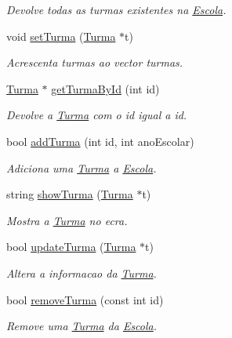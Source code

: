 \begin{DoxyCompactItemize}
\begin{DoxyCompactList}\small\item\em Devolve todas as turmas existentes na \hyperlink{class_escola}{Escola}. \end{DoxyCompactList}\item 
void \hyperlink{class_escola_a75635f871c420f3d1373285b1e773ce8}{set\-Turma} (\hyperlink{class_turma}{Turma} $\ast$t)
\begin{DoxyCompactList}\small\item\em Acrescenta turmas ao vector turmas. \end{DoxyCompactList}\item 
\hyperlink{class_turma}{Turma} $\ast$ \hyperlink{class_escola_a5dab98b3f36b81a764b104d9d9a302e8}{get\-Turma\-By\-Id} (int id)
\begin{DoxyCompactList}\small\item\em Devolve a \hyperlink{class_turma}{Turma} com o id igual a id. \end{DoxyCompactList}\item 
bool \hyperlink{class_escola_a86d547f74fe935bfd8bdf3cd35d25860}{add\-Turma} (int id, int ano\-Escolar)
\begin{DoxyCompactList}\small\item\em Adiciona uma \hyperlink{class_turma}{Turma} a \hyperlink{class_escola}{Escola}. \end{DoxyCompactList}\item 
string \hyperlink{class_escola_a91096932c5326cb2e5c30cbd860c126c}{show\-Turma} (\hyperlink{class_turma}{Turma} $\ast$t)
\begin{DoxyCompactList}\small\item\em Mostra a \hyperlink{class_turma}{Turma} no ecra. \end{DoxyCompactList}\item 
bool \hyperlink{class_escola_a50eb8daf94842be3184daa133140157d}{update\-Turma} (\hyperlink{class_turma}{Turma} $\ast$t)
\begin{DoxyCompactList}\small\item\em Altera a informacao da \hyperlink{class_turma}{Turma}. \end{DoxyCompactList}\item 
bool \hyperlink{class_escola_a4011a23d4f49827e7cc74ea5739e9033}{remove\-Turma} (const int id)
\begin{DoxyCompactList}\small\item\em Remove uma \hyperlink{class_turma}{Turma} da \hyperlink{class_escola}{Escola}. \end{DoxyCompactList}\item 

\end{DoxyCompactItemize}
